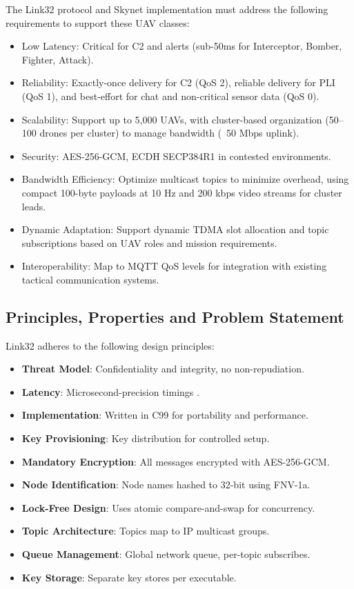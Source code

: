 \documentclass{article}
\begin{document}
The Link32 protocol and Skynet implementation must address
the following requirements to support these UAV classes:

\begin{itemize}
\item Low Latency: Critical for C2 and alerts (sub-50ms for Interceptor, Bomber, Fighter, Attack).
\item Reliability: Exactly-once delivery for C2 (QoS 2), reliable delivery for PLI (QoS 1), and best-effort for chat and non-critical sensor data (QoS 0).
\item Scalability: Support up to 5,000 UAVs, with cluster-based organization (50–100 drones per cluster) to manage bandwidth (~50 Mbps uplink).
\item Security: AES-256-GCM, ECDH SECP384R1 in contested environments.
\item Bandwidth Efficiency: Optimize multicast topics to minimize overhead, using compact 100-byte payloads at 10 Hz and 200 kbps video streams for cluster leads.
\item Dynamic Adaptation: Support dynamic TDMA slot allocation and topic subscriptions based on UAV roles and mission requirements.
\item Interoperability: Map to MQTT QoS levels for integration with existing tactical communication systems.
\end{itemize}

\subsection{Principles, Properties and Problem Statement}
Link32 adheres to the following design principles:
\begin{itemize}
    \item \textbf{Threat Model}: Confidentiality and integrity, no non-repudiation.
    \item \textbf{Latency}: Microsecond-precision timings .
    \item \textbf{Implementation}: Written in C99 for portability and performance.
    \item \textbf{Key Provisioning}: Key distribution for controlled setup.
    \item \textbf{Mandatory Encryption}: All messages encrypted with AES-256-GCM.
    \item \textbf{Node Identification}: Node names hashed to 32-bit using FNV-1a.
    \item \textbf{Lock-Free Design}: Uses atomic compare-and-swap for concurrency.
    \item \textbf{Topic Architecture}: Topics map to IP multicast groups.
    \item \textbf{Queue Management}: Global network queue, per-topic subscribes.
    \item \textbf{Key Storage}: Separate key stores per executable.
\end{itemize}
\end{document}
